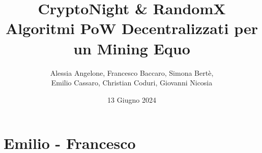 \documentclass{report}[12pt]
\title{%
  \vspace{-2cm}
  \Huge \textbf{CryptoNight \& RandomX} \\
  \vspace{0.5cm}
  \LARGE Algoritmi PoW Decentralizzati per un Mining Equo \\
  \vspace{1cm}
}
\author{Alessia Angelone, Francesco Baccaro, Simona Bertè, \\ Emilio Cassaro, Christian Coduri, Giovanni Nicosia}
\date{13 Giugno 2024}
\begin{document}
\maketitle
\tableofcontents




\graphicspath{{./bozza/media/}}
\chapter{Emilio - Francesco} %


\graphicspath{{./images/}}






\end{document}
